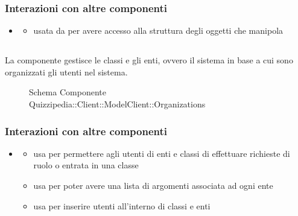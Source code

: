 \subsubsection{Interazioni con altre componenti}
\begin{itemize}
\item {}
\begin{itemize}
\item usata da  per avere accesso alla struttura degli oggetti che manipola
\end{itemize}
\end{itemize}
\subsection{}
La componente gestisce le classi e gli enti, ovvero il sistema in base a cui sono organizzati gli utenti nel sistema.
\begin{figure}[H]
\centering
\noindent{}
\caption[Schema Componente Quizzipedia::Client::ModelClient::Organizations]{Schema Componente Quizzipedia::Client::ModelClient::Organizations}
\end{figure}
\subsubsection{Interazioni con altre componenti}
\begin{itemize}
\item {}
\begin{itemize}
\item usa  per permettere agli utenti di enti e classi di effettuare richieste di ruolo o entrata in una classe
\item usa  per poter avere una lista di argomenti associata ad ogni ente
\item usa  per inserire utenti all'interno di classi e enti
\end{itemize}
\end{itemize}
